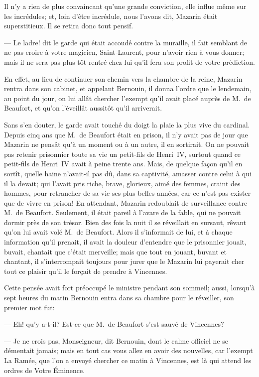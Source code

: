 Il n'y a rien de plus convaincant qu'une grande conviction, elle influe même sur les incrédules; et, loin d'être incrédule, nous l'avons dit, Mazarin était superstitieux. Il se retira donc tout pensif.

— Le ladre! dit le garde qui était accoudé contre la muraille, il fait semblant de ne pas croire à votre magicien, Saint-Laurent, pour n'avoir rien à vous donner; mais il ne sera pas plus tôt rentré chez lui qu'il fera son profit de votre prédiction.

En effet, au lieu de continuer son chemin vers la chambre de la reine, Mazarin rentra dans son cabinet, et appelant Bernouin, il donna l'ordre que le lendemain, au point du jour, on lui allât chercher l'exempt qu'il avait placé auprès de M.~de Beaufort, et qu'on l'éveillât aussitôt qu'il arriverait.

Sans s'en douter, le garde avait touché du doigt la plaie la plus vive du cardinal. Depuis cinq ans que M.~de Beaufort était en prison, il n'y avait pas de jour que Mazarin ne pensât qu'à un moment ou à un autre, il en sortirait. On ne pouvait pas retenir prisonnier toute sa vie un petit-fils de Henri~IV, surtout quand ce petit-fils de Henri~IV avait à peine trente ans. Mais, de quelque façon qu'il en sortît, quelle haine n'avait-il pas dû, dans sa captivité, amasser contre celui à qui il la devait; qui l'avait pris riche, brave, glorieux, aimé des femmes, craint des hommes, pour retrancher de sa vie ses plus belles années, car ce n'est pas exister que de vivre en prison! En attendant, Mazarin redoublait de surveillance contre M.~de Beaufort. Seulement, il était pareil à l'avare de la fable, qui ne pouvait dormir près de son trésor. Bien des fois la nuit il se réveillait en sursaut, rêvant qu'on lui avait volé M.~de Beaufort. Alors il s'informait de lui, et à chaque information qu'il prenait, il avait la douleur d'entendre que le prisonnier jouait, buvait, chantait que c'était merveille; mais que tout en jouant, buvant et chantant, il s'interrompait toujours pour jurer que le Mazarin lui payerait cher tout ce plaisir qu'il le forçait de prendre à Vincennes.

Cette pensée avait fort préoccupé le ministre pendant son sommeil; aussi, lorsqu'à sept heures du matin Bernouin entra dans sa chambre pour le réveiller, son premier mot fut:

— Eh! qu'y a-t-il? Est-ce que M.~de Beaufort s'est sauvé de Vincennes?

— Je ne crois pas, Monseigneur, dit Bernouin, dont le calme officiel ne se démentait jamais; mais en tout cas vous allez en avoir des nouvelles, car l'exempt La Ramée, que l'on a envoyé chercher ce matin à Vincennes, est là qui attend les ordres de Votre Éminence.


